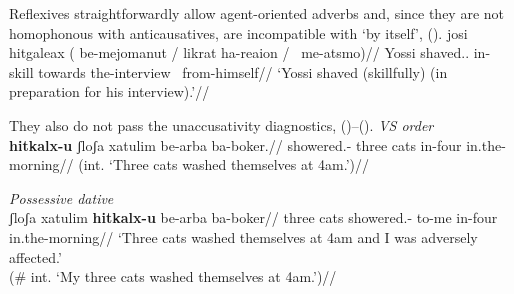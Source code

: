 {{%
%
%
%

Reflexives straightforwardly allow agent-oriented adverbs and, since they are not homophonous with anticausatives, are incompatible with `by itself', (\nextx).
\ex
	\begingl
		\gla josi hitgaleax ({\cmark} be-mejomanut / {\cmark} likrat ha-reaion / {\xmark}~me-a{ts}mo)//
		\glb Yossi shaved.. {} in-skill {} {} towards the-interview {} {\phantom{\xmark}}~from-himself//
		\glft `Yossi shaved (skillfully) (in preparation for his interview).'//
	\endgl
\xe

They also do not pass the unaccusativity diagnostics, (\nextx)--(\anextx).
\ex \textit{VS order}\\
	\begingl
	\gla \ljudge{\#}\textbf{hitkalx-u} ʃloʃa xatulim be-arba ba-boker.//
	\glb showered.- three cats in-four in.the-morning//
	\glft (int. `Three cats washed themselves at 4am.')//
	\endgl
\xe

\ex \textit{Possessive dative}\\
	\begingl 
	\gla \ljudge{\#}ʃloʃa xatulim \textbf{hitkalx-u}  be-arba ba-boker//
	\glb three cats showered.- to-me in-four in.the-morning//
	\glft `Three cats washed themselves at 4am and I was adversely affected.'\\
		(\# int. `My three cats washed themselves at 4am.')//
	\endgl
\xe

}}
